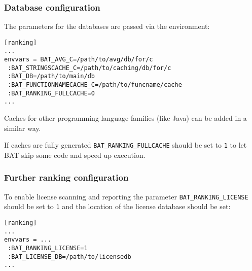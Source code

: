 \documentclass[11pt]{beamer}
\begin{document}
\begin{frame}[fragile]
\frametitle{Database configuration}
The parameters for the databases are passed via the environment:

\begin{verbatim}
[ranking]
...
envvars = BAT_AVG_C=/path/to/avg/db/for/c
 :BAT_STRINGSCACHE_C=/path/to/caching/db/for/c
 :BAT_DB=/path/to/main/db
 :BAT_FUNCTIONNAMECACHE_C=/path/to/funcname/cache
 :BAT_RANKING_FULLCACHE=0
...
\end{verbatim}

Caches for other programming language families (like Java) can be added in a similar way.

If caches are fully generated \texttt{BAT\_RANKING\_FULLCACHE} should be set to \texttt{1} to let BAT skip some code and speed up execution.
\end{frame}

\begin{frame}[fragile]
\frametitle{Further ranking configuration}
To enable license scanning and reporting the parameter \texttt{BAT\_RANKING\_LICENSE} should be set to \texttt{1} and the location of the license database should be set:

\begin{verbatim}
[ranking]
...
envvars = ...
 :BAT_RANKING_LICENSE=1
 :BAT_LICENSE_DB=/path/to/licensedb
...
\end{verbatim}
\end{frame}

\end{document}
